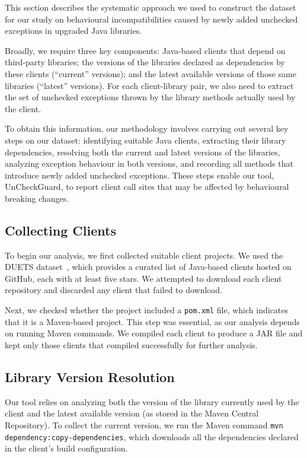 This section describes the systematic approach we used to construct the dataset for our study on behavioural incompatibilities caused by newly added unchecked exceptions in upgraded Java libraries. 

Broadly, we require three key components: Java-based clients that depend on third-party libraries; the versions of the libraries declared as dependencies by these clients (``current'' versions); and the latest available versions of those same libraries (``latest'' versions). For each client-library pair, we also need to extract the set of unchecked exceptions thrown by the library methods actually used by the client.

To obtain this information, our methodology involves carrying out several key steps on our dataset: identifying suitable Java clients, extracting their library dependencies, resolving both the current and latest versions of the libraries, analyzing exception behaviour in both versions, and recording all methods that introduce newly added unchecked exceptions. These steps enable our tool, UnCheckGuard, to report client call sites that may be affected by behavioural breaking changes.

\subsection{Collecting Clients}

To begin our analysis, we first collected suitable client projects. We used the DUETS dataset~\cite{durieux21:_duets}, which provides a curated list of Java-based clients hosted on GitHub, each with at least five stars. We attempted to download each client repository and discarded any client that failed to download.

Next, we checked whether the project included a \texttt{pom.xml} file, which indicates that it is a Maven-based project. This step was essential, as our analysis depends on running Maven commands. We compiled each client to produce a JAR file and kept only those clients that compiled successfully for further analysis.

\subsection{Library Version Resolution}

Our tool relies on analyzing both the version of the library currently used by the client and the latest available version (as stored in the Maven Central Repository). To collect the current version, we run the Maven command \texttt{mvn dependency:copy-dependencies}, which downloads all the dependencies declared in the client's build configuration.

